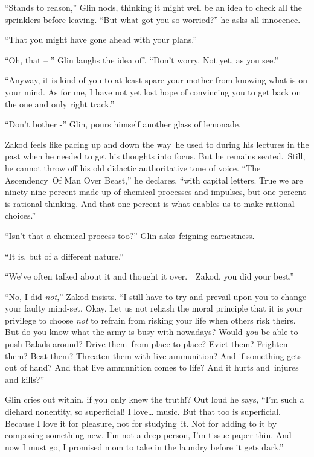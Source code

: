 \documentclass[twoside,11pt]{book}
\begin{document}
``Stands to reason,'' Glin nods, thinking it might well be an idea to check all the sprinklers
before leaving. ``But what got you so worried?'' he asks all innocence. 

``That you might have gone ahead with your plans.'' 

``Oh, that -- '' Glin laughs the idea off. ``Don't worry. Not yet, as you
see.'' 

``Anyway, it is kind of you to at least spare your mother from knowing what is on your mind. As for me, I
have not yet lost hope of convincing you to get back on the one and only right track.'' 

``Don't bother -'' Glin, pours himself another glass of lemonade. 

Zakod feels like pacing up and down the way~he used to during his lectures in the past when he needed to get his
thoughts into focus. But he remains seated.\ Still, he cannot throw off his old didactic authoritative tone of voice.
``The Ascendency\ Of Man Over Beast,'' he declares, ``with capital letters. True we are
ninety-nine percent made up of chemical processes and impulses, but one percent is rational thinking. And that one
percent is what enables us to make rational choices.'' 

``Isn't that a chemical process too?'' Glin
asks{\ }feigning earnestness. 

``It is, but of a different nature.'' 

``We've often talked about it and thought it over.\ \ Zakod, you did your best.'' 

``No, I did \textit{not},'' Zakod insists. ``I still have to try and prevail upon
you to change your faulty mind-set. Okay. Let us not rehash the moral principle that it is your privilege to choose
\textit{not} to refrain from risking your life when others risk theirs. But do you know what the army is busy with
nowadays? Would \textit{you} be able to push Balads around? Drive them~from place to place? Evict them? Frighten them?
Beat them? Threaten them with live ammunition? And if something gets out of hand? And that live ammunition comes to
life? And it hurts and~injures and kills?'' 

Glin cries out within, if you only knew the truth!? Out loud he says, ``I'm such a diehard nonentity, so
superficial! I love{\dots} music. But that too is superficial. Because I love it for pleasure, not for studying~it. Not
for adding to it by composing something new. I'm not a deep person, I'm tissue paper thin. And now I must go, I
promised mom to take in the laundry before it gets dark.'' 
\end{document}
